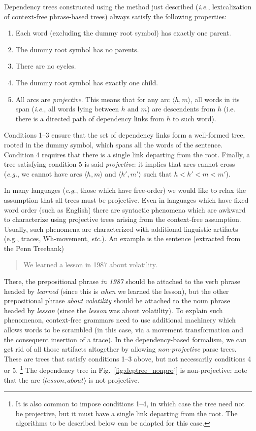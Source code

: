 Dependency trees constructed using the method just described (\emph{i.e.}, lexicalization of context-free phrase-based trees) always satisfy the following properties: 
\begin{enumerate}
\item Each word (excluding the dummy root symbol) has exactly one parent. 
\item The dummy root symbol has no parents.
\item There are no cycles. 
\item The dummy root symbol has exactly one child. 
\item All arcs are \emph{projective}. This means that for any arc $\langle h,m \rangle$, all words in its span (\emph{i.e.}, all words lying between $h$ and $m$) 
are descendents from $h$ (i.e. there is a directed path of dependency links from $h$ to such word). 
\end{enumerate}

Conditions 1--3 ensure that the set of dependency links form a well-formed tree, rooted in the dummy symbol, which spans all the words of the sentence. 
Condition 4 requires that there is a single link departing from the root. 
Finally, a tree satisfying condition 5 is said \emph{projective}: it implies that arcs cannot cross (\emph{e.g.}, we cannot have arcs $\langle h,m \rangle$ and $\langle h',m' \rangle$ 
such that $h < h' < m < m'$). 

In many languages (\emph{e.g.}, those which have free-order) we would like to relax the assumption that all trees must be projective. Even in languages which have fixed word order 
(such as English) there are syntactic phenomena which are awkward to characterize using projective trees arising from the context-free assumption. Usually, 
such phenomena are characterized with additional linguistic artifacts (e.g., traces, Wh-movement, \emph{etc.}). 
An example is the sentence (extracted from the Penn Treebank)
\begin{quote}
We learned a lesson in 1987 about volatility. 
\end{quote}
There, the prepositional phrase \emph{in 1987} should be attached to the verb phrase headed by \emph{learned} (since this is \emph{when} we learned the lesson), 
but the other prepositional phrase \emph{about volatility} should be attached to the noun phrase headed by \emph{lesson} (since the \emph{lesson} was about volatility). 
To explain such phenomenon, 
context-free grammars need to use additional machinery which allows words to be scrambled (in this case, via a movement transformation and the consequent insertion of a trace). 
In the dependency-based formalism, we can get rid of all those artifacts altogether by allowing \emph{non-projective} parse trees. 
These are trees that satisfy conditions 1--3 above, but not necessarily conditions 4 or 5.%
\footnote{It is also common to impose conditions 1--4, in which case the tree need not be projective, but it must have a 
single link departing from the root. The algorithms to be described below can be adapted for this case.} 
The dependency tree in Fig.~\ref{fig:deptree_nonproj} is non-projective: note that the arc $\langle lesson, about \rangle$ is not projective. 

